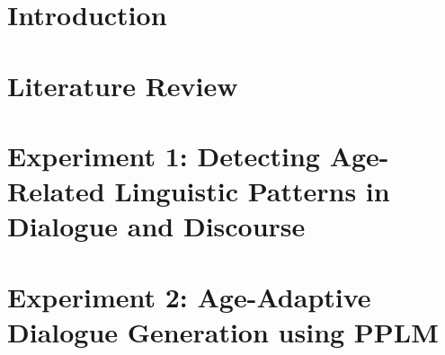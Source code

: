 \documentclass{report}
\begin{document}
\newpage
\chapter{Introduction}


\chapter{Literature Review}


\chapter{Experiment 1: Detecting Age-Related Linguistic Patterns in Dialogue and Discourse}\label{ch:experiment1}








\chapter{Experiment 2: Age-Adaptive Dialogue Generation using PPLM}



% 





% 


% 


% 

% 
\end{document}
